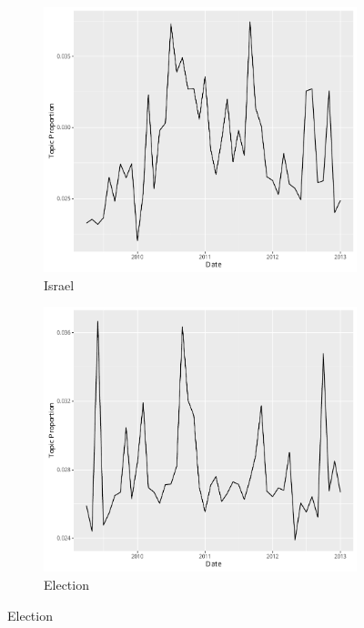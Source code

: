 \documentclass[12pt]{article}
\theoremstyle{definition}
\theoremstyle{algodesc}
\begin{document}
\begin{figure}[h]
\centering
\begin{subfigure}[Israel]{.30\linewidth}
    \includegraphics[width=\linewidth]{../images/time_plot6.pdf}
    \caption{Israel} \label{fig:t1}
\end{subfigure}
\begin{subfigure}[Election]{.30\linewidth}
    \includegraphics[width=\linewidth]{../images/time_plot11.pdf}
    \caption{Election} \label{fig:t2}
\end{subfigure}

\end{figure}
\end{document}
